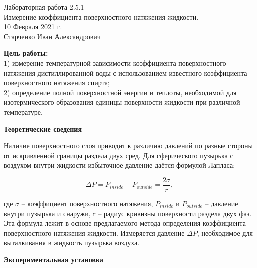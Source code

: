 \documentclass[a4paper,12pt]{article} %
\author{}
\title{}
\date{}
\begin{document}

\setcounter{page}{1}



\begin{center}
  \LARGE{Лабораторная работа 2.5.1}\\[0.2cm]
  \LARGE{Измерение коэффициента поверхностного натяжения жидкости.}\\[0.2cm]
  \large{10 Февраля 2021 г.}\\[0.2cm]
  \large{Старченко Иван Александрович}\\[0.2cm]
\end{center}

\textbf{Цель работы:} \\
1) измерение температурной зависимости  коэффициента поверхностного натяжения дистиллированной воды с использованием известного коэффициента поверхностного натяжения спирта;  \\
2) определение полной поверхностной энергии  и теплоты, необходимой для изотермического образования единицы  поверхности жидкости  при различной температуре. 


\begin{center}
	\large{\textbf{Теоретические сведения}}
\end{center}

Наличие поверхностного слоя приводит к различию давлений по разные стороны от искривленной границы раздела двух сред.  Для сферического пузырька с воздухом  внутри жидкости избыточное давление даётся формулой Лапласа:

\begin{equation}
	\Delta P = P_{inside} - P_{outside} = \frac{2\sigma}{r},
\end{equation}

где $\sigma$ – коэффициент поверхностного натяжения, $P_{inside}$ и $P_{outside}$ – давление внутри пузырька и снаружи, r – радиус кривизны поверхности раздела двух фаз. Эта формула лежит в основе предлагаемого метода определения коэффициента поверхностного натяжения жидкости. Измеряется давление $\Delta P$, необходимое для выталкивания в жидкость пузырька воздуха.

\begin{center}
	\large{\textbf{Экспериментальная установка}}
\end{center}
\end{document}
